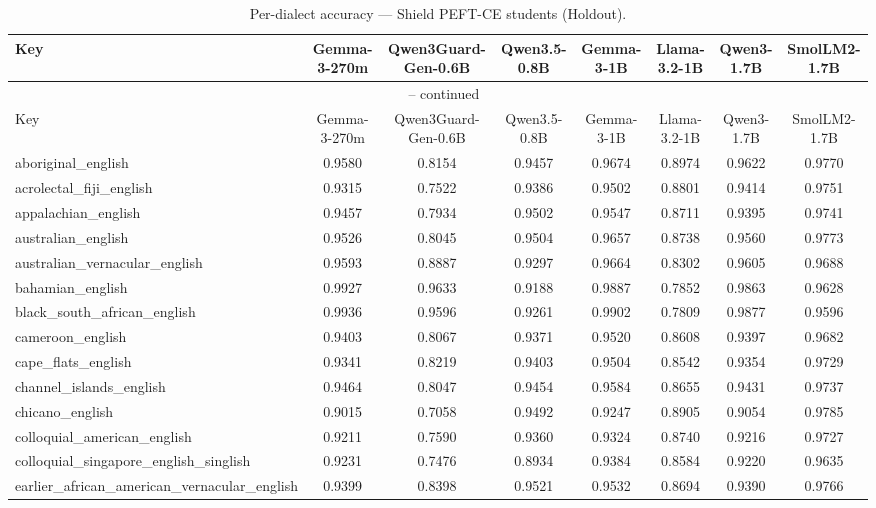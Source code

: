\begin{landscape}
\begin{longtable}{lccccccc}
\caption{Per-dialect accuracy — Shield PEFT-CE students (Holdout).} \\
\label{tab:students_peft_ce_per_dialect_holdout}
\toprule
Key & Gemma-3-270m & Qwen3Guard-Gen-0.6B & Qwen3.5-0.8B & Gemma-3-1B & Llama-3.2-1B & Qwen3-1.7B & SmolLM2-1.7B \\
\midrule
\endfirsthead
\multicolumn{8}{c}{\tablename\ \thetable{} -- continued} \\
\toprule
Key & Gemma-3-270m & Qwen3Guard-Gen-0.6B & Qwen3.5-0.8B & Gemma-3-1B & Llama-3.2-1B & Qwen3-1.7B & SmolLM2-1.7B \\
\midrule
\endhead
aboriginal\_english & 0.9580 & 0.8154 & 0.9457 & 0.9674 & 0.8974 & 0.9622 & 0.9770 \\
acrolectal\_fiji\_english & 0.9315 & 0.7522 & 0.9386 & 0.9502 & 0.8801 & 0.9414 & 0.9751 \\
appalachian\_english & 0.9457 & 0.7934 & 0.9502 & 0.9547 & 0.8711 & 0.9395 & 0.9741 \\
australian\_english & 0.9526 & 0.8045 & 0.9504 & 0.9657 & 0.8738 & 0.9560 & 0.9773 \\
australian\_vernacular\_english & 0.9593 & 0.8887 & 0.9297 & 0.9664 & 0.8302 & 0.9605 & 0.9688 \\
bahamian\_english & 0.9927 & 0.9633 & 0.9188 & 0.9887 & 0.7852 & 0.9863 & 0.9628 \\
black\_south\_african\_english & 0.9936 & 0.9596 & 0.9261 & 0.9902 & 0.7809 & 0.9877 & 0.9596 \\
cameroon\_english & 0.9403 & 0.8067 & 0.9371 & 0.9520 & 0.8608 & 0.9397 & 0.9682 \\
cape\_flats\_english & 0.9341 & 0.8219 & 0.9403 & 0.9504 & 0.8542 & 0.9354 & 0.9729 \\
channel\_islands\_english & 0.9464 & 0.8047 & 0.9454 & 0.9584 & 0.8655 & 0.9431 & 0.9737 \\
chicano\_english & 0.9015 & 0.7058 & 0.9492 & 0.9247 & 0.8905 & 0.9054 & 0.9785 \\
colloquial\_american\_english & 0.9211 & 0.7590 & 0.9360 & 0.9324 & 0.8740 & 0.9216 & 0.9727 \\
colloquial\_singapore\_english\_singlish & 0.9231 & 0.7476 & 0.8934 & 0.9384 & 0.8584 & 0.9220 & 0.9635 \\
earlier\_african\_american\_vernacular\_english & 0.9399 & 0.8398 & 0.9521 & 0.9532 & 0.8694 & 0.9390 & 0.9766 \\

\end{longtable}
\end{landscape}
